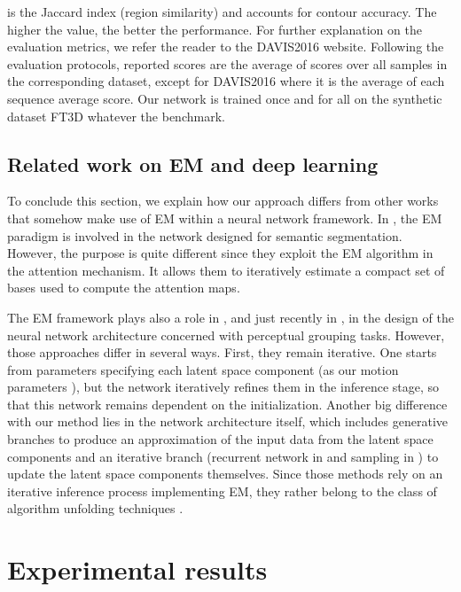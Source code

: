 \documentclass[10pt,twocolumn,letterpaper]{article}
\begin{document}
\begin{table*}[tb!]
{ is the Jaccard index (region similarity) and  accounts for contour accuracy. The higher the value, the better the performance. For further explanation on the evaluation metrics, we refer the reader to the DAVIS2016 website. Following the evaluation protocols, reported scores are the average of scores over all samples in the corresponding dataset, except for DAVIS2016 where it is the average of each sequence average score. {\color{black} Our network is trained once and for all on the synthetic dataset FT3D whatever the benchmark.}
}
 \label{tab:results}
 \vspace{-0.6cm}
\end{table*}

\subsection{Related work on EM and deep learning}

To conclude this section, we explain how our approach differs from other works that somehow make use of EM within a neural network framework. 
In \cite{li2019}, the EM paradigm is involved in the network designed for semantic segmentation. However, the purpose is quite different since they exploit the EM algorithm in the attention mechanism. It allows them to iteratively estimate a compact set of bases used to compute the attention maps.

The EM framework plays also a role in \cite{greff2016,greff2017}, and just recently in \cite{Yu-2021}, in the design of the neural network architecture concerned with perceptual grouping tasks. However, those approaches differ in several ways. First, they remain iterative. One starts from parameters specifying each latent space component (as our motion parameters ), but the network iteratively refines them in the inference stage, so that this network remains dependent on the initialization. Another big difference with our method lies in the network architecture itself, which includes generative branches to produce an approximation of the input data from the latent space components and an iterative branch (recurrent network in \cite{greff2016,greff2017} and sampling in \cite{Yu-2021}) to update the latent space components themselves. 
Since those methods rely on an iterative inference process implementing EM, they rather belong to the class of algorithm unfolding techniques \cite{monga2021}. 

\section{Experimental results}
\label{results}
\end{document}
